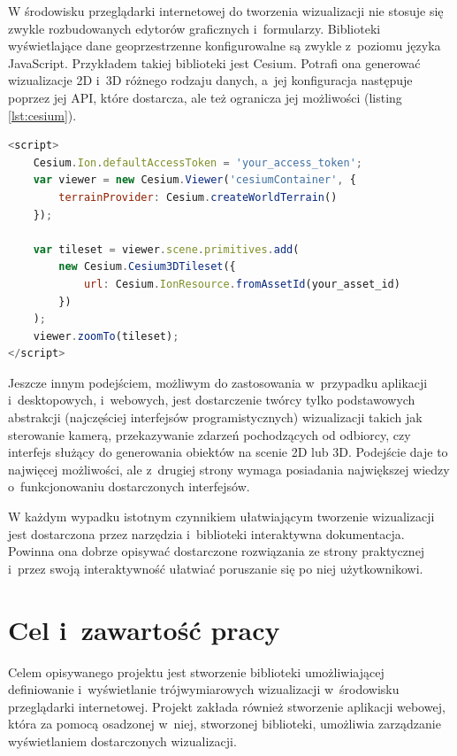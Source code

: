 W środowisku przeglądarki internetowej do tworzenia wizualizacji nie stosuje się zwykle rozbudowanych edytorów graficznych i~formularzy. Biblioteki wyświetlające dane geoprzestrzenne konfigurowalne są zwykle z~poziomu języka JavaScript. Przykładem takiej biblioteki jest Cesium\cite{CesiumJS}. Potrafi ona generować wizualizacje 2D i~3D różnego rodzaju danych, a~jej konfiguracja następuje poprzez jej API, które dostarcza, ale też ogranicza jej możliwości (listing \ref{lst:cesium}).

\begin{lstlisting}[label={lst:cesium}, language=javascript, caption={Konfiguracja podstawowej wizualizacji w~bibliotece Cesium. Żródło: \url{https://cesium.com/docs/tutorials/getting-started/}}]
<script>
    Cesium.Ion.defaultAccessToken = 'your_access_token';
    var viewer = new Cesium.Viewer('cesiumContainer', {
        terrainProvider: Cesium.createWorldTerrain()
    });

    var tileset = viewer.scene.primitives.add(
        new Cesium.Cesium3DTileset({
            url: Cesium.IonResource.fromAssetId(your_asset_id)
        })
    );
    viewer.zoomTo(tileset);
</script>
\end{lstlisting}

Jeszcze innym podejściem, możliwym do zastosowania w~przypadku aplikacji i~desktopowych, i~webowych, jest dostarczenie twórcy tylko podstawowych abstrakcji (najczęściej interfejsów programistycznych) wizualizacji takich jak sterowanie kamerą, przekazywanie zdarzeń pochodzących od odbiorcy, czy interfejs służący do generowania obiektów na scenie 2D lub 3D. Podejście daje to najwięcej możliwości, ale z~drugiej strony wymaga posiadania największej wiedzy o~funkcjonowaniu dostarczonych interfejsów.

W każdym wypadku istotnym czynnikiem ułatwiającym tworzenie wizualizacji jest dostarczona przez narzędzia i~biblioteki interaktywna dokumentacja. Powinna ona dobrze opisywać dostarczone rozwiązania ze strony praktycznej i~przez swoją interaktywność ułatwiać poruszanie się po niej użytkownikowi. 

\section{Cel i~zawartość pracy}

Celem opisywanego projektu jest stworzenie biblioteki umożliwiającej definiowanie i~wyświetlanie trójwymiarowych wizualizacji w~środowisku przeglądarki internetowej. Projekt zakłada również stworzenie aplikacji webowej, która za pomocą osadzonej w~niej, stworzonej biblioteki, umożliwia zarządzanie wyświetlaniem dostarczonych wizualizacji.

